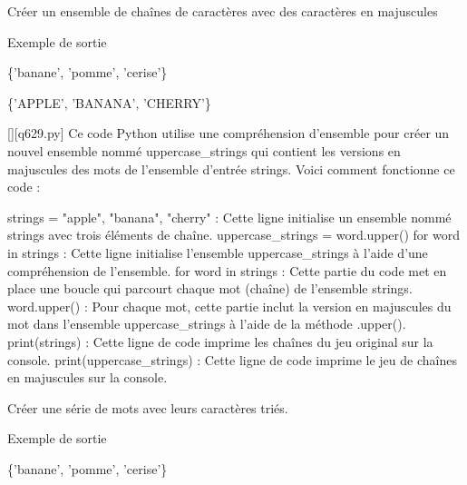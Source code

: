         \question
        Créer un ensemble de chaînes de caractères avec des caractères en majuscules

Exemple de sortie

\{'banane', 'pomme', 'cerise'\}

\{'APPLE', 'BANANA', 'CHERRY'\}
        \par
        \begin{solution}
            \renewcommand{\nomfichier}{q629.py}
            \pythonfile{\chemincode \nomfichier}[][\nomfichier]
            Ce code Python utilise une compréhension d'ensemble pour créer un nouvel ensemble nommé uppercase_strings qui contient les versions en majuscules des mots de l'ensemble d'entrée strings. Voici comment fonctionne ce code :

    strings = {"apple", "banana", "cherry"} : Cette ligne initialise un ensemble nommé strings avec trois éléments de chaîne.
    uppercase_strings = {word.upper() for word in strings} : Cette ligne initialise l'ensemble uppercase_strings à l'aide d'une compréhension de l'ensemble.
        for word in strings : Cette partie du code met en place une boucle qui parcourt chaque mot (chaîne) de l'ensemble strings.
        {word.upper()} : Pour chaque mot, cette partie inclut la version en majuscules du mot dans l'ensemble uppercase_strings à l'aide de la méthode .upper().
    print(strings) : Cette ligne de code imprime les chaînes du jeu original sur la console.
    print(uppercase_strings) : Cette ligne de code imprime le jeu de chaînes en majuscules sur la console.
        \end{solution}
        

        \question
        Créer une série de mots avec leurs caractères triés.

Exemple de sortie

\{'banane', 'pomme', 'cerise'\}

